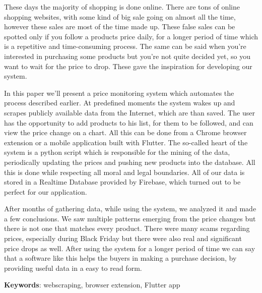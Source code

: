 These days the majority of shopping is done online. There are tons of online shopping websites, with some kind of big sale going on almost all the time, however these sales are most of the time made up. These false sales can be spotted only if you follow a products price daily, for a longer period of time which is a repetitive and time-consuming process. The same can be said when you’re interested in purchasing some products but you’re not quite decided yet, so you want to wait for the price to drop. These gave the inspiration for developing our system.

In this paper we’ll present a price monitoring system which automates the process described earlier. At predefined moments the system wakes up and scrapes publicly available data from the Internet, which are than saved. The user has the opportunity to add products to his list, for them to be followed, and can view the price change on a chart. All this can be done from a Chrome browser extension or a mobile application built with Flutter. The so-called heart of the system is a python script which is responsible for the mining of the data, periodically updating the prices and pushing new products into the database. All this is done while respecting all moral and legal boundaries. All of our data is stored in a Realtime Database provided by Firebase, which turned out to be perfect for our application.

After months of gathering data, while using the system, we analyzed it and made a few conclusions. We saw multiple patterns emerging from the price changes but there is not one that matches every product. There were many scams regarding prices, especially during Black Friday but there were also real and significant price drops as well. After using the system for a longer period of time we can say that a software like this helps the buyers in making a purchase decision, by providing useful data in a easy to read form.

\textbf{Keywords}: webscraping, browser extension, Flutter app